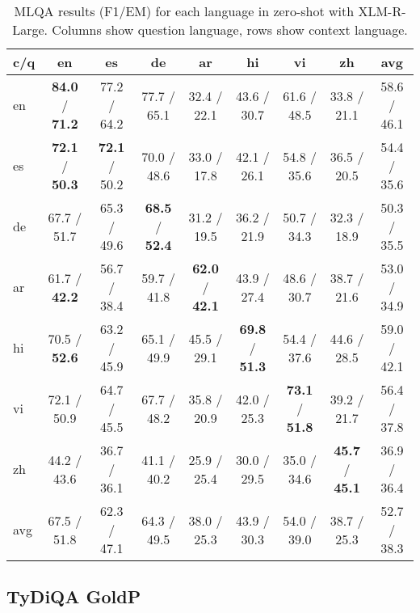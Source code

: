 \documentclass[11pt]{article}
\begin{document}
\begin{table*}[ht]
    \centering
    \begin{adjustbox}{max width=\textwidth}
    \begin{tabular}{l|ccccccc|c}
    \toprule
        c/q & en & es & de & ar & hi & vi & zh & avg \\ \midrule
        en & \textbf{84.0} / \textbf{71.2} & 77.2 / 64.2 & 77.7 / 65.1 & 32.4 / 22.1 & 43.6 / 30.7 & 61.6 / 48.5 & 33.8 / 21.1 & 58.6 / 46.1 \\ 
        es & \textbf{72.1} / \textbf{50.3} & \textbf{72.1} / 50.2 & 70.0 / 48.6 & 33.0 / 17.8 & 42.1 / 26.1 & 54.8 / 35.6 & 36.5 / 20.5 & 54.4 / 35.6 \\ 
        de & 67.7 / 51.7 & 65.3 / 49.6 & \textbf{68.5} / \textbf{52.4} & 31.2 / 19.5 & 36.2 / 21.9 & 50.7 / 34.3 & 32.3 / 18.9 & 50.3 / 35.5 \\ 
        ar & 61.7 / \textbf{42.2} & 56.7 / 38.4 & 59.7 / 41.8 & \textbf{62.0} / \textbf{42.1} & 43.9 / 27.4 & 48.6 / 30.7 & 38.7 / 21.6 & 53.0 / 34.9 \\ 
        hi & 70.5 / \textbf{52.6} & 63.2 / 45.9 & 65.1 / 49.9 & 45.5 / 29.1 & \textbf{69.8} / \textbf{51.3} & 54.4 / 37.6 & 44.6 / 28.5 & 59.0 / 42.1 \\ 
        vi & 72.1 / 50.9 & 64.7 / 45.5 & 67.7 / 48.2 & 35.8 / 20.9 & 42.0 / 25.3 & \textbf{73.1} / \textbf{51.8} & 39.2 / 21.7 & 56.4 / 37.8 \\ 
        zh & 44.2 / 43.6 & 36.7 / 36.1 & 41.1 / 40.2 & 25.9 / 25.4 & 30.0 / 29.5 & 35.0 / 34.6 & \textbf{45.7} / \textbf{45.1} & 36.9 / 36.4 \\ \midrule
        avg & 67.5 / 51.8 & 62.3 / 47.1 & 64.3 / 49.5 & 38.0 / 25.3 & 43.9 / 30.3 & 54.0 / 39.0 & 38.7 / 25.3 & 52.7 / 38.3 \\ \bottomrule
    \end{tabular}
    \end{adjustbox}
    \caption{MLQA results (F1/EM) for each language in zero-shot with XLM-R-Large. Columns show question language, rows show context language.}
    \label{MLQA_results_ZS_XLM-R-Large}
\end{table*}

\subsection{TyDiQA GoldP}
\end{document}
